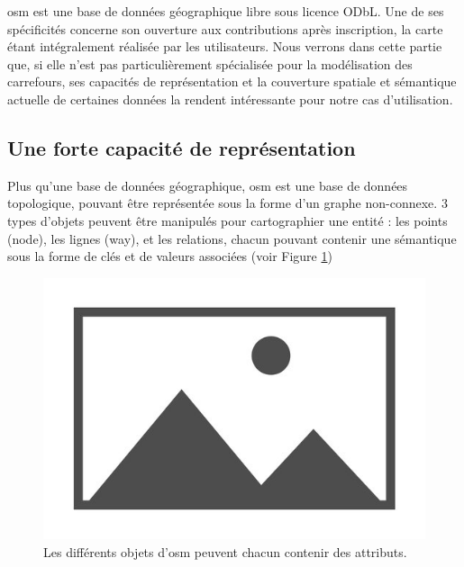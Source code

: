 \label{sec:modelisation_osm}


\gls{osm} est une base de données géographique libre sous licence ODbL. Une de ses spécificités concerne son ouverture aux contributions après inscription, la carte étant intégralement réalisée par les utilisateurs. Nous verrons dans cette partie que, si elle n'est pas particulièrement spécialisée pour la modélisation des carrefours, ses capacités de représentation et la couverture spatiale et sémantique actuelle de certaines données la rendent intéressante pour notre cas d'utilisation.

\subsection{Une forte capacité de représentation}

Plus qu'une base de données géographique, \gls{osm} est une base de données topologique, pouvant être représentée sous la forme d'un graphe non-connexe. 3 types d'objets peuvent être manipulés pour cartographier une entité : les points (node), les lignes (way), et les relations, chacun pouvant contenir une sémantique sous la forme de clés et de valeurs associées (voir Figure \ref{fig:mod_ex_donnee_osm})

\begin{figure}
    \centering
    \includegraphics{images/placeholder.jpg}
    \caption{Les différents objets d'\gls{osm} peuvent chacun contenir des attributs.}
    \label{fig:mod_ex_donnee_osm}
\end{figure}

